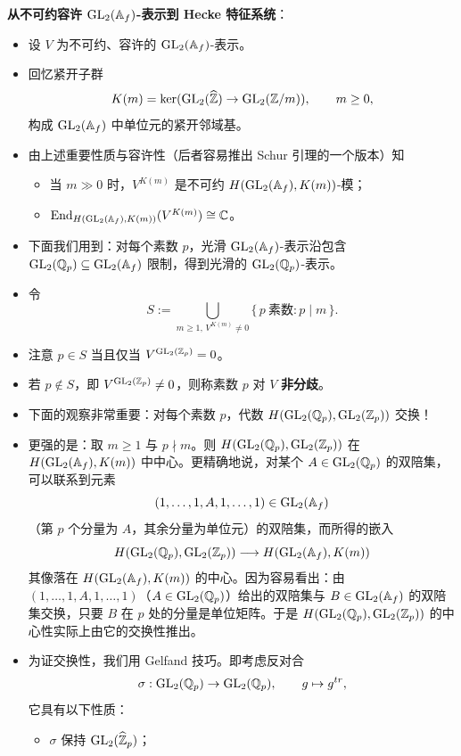 \textbf{从不可约容许 $\GL_2(\Af)$-表示到 Hecke 特征系统}：
\begin{itemize}
\item 设 $V$ 为不可约、容许的 $\GL_2(\Af)$-表示。
\item 回忆紧开子群
\[
K(m)=\ker(\GL_2(\widehat\Z)\to\GL_2(\Z/m)),\qquad m\ge0,
\]
构成 $\GL_2(\Af)$ 中单位元的紧开邻域基。
\item 由上述重要性质与容许性（后者容易推出 Schur 引理的一个版本）知
\begin{itemize}
\item 当 $m\gg0$ 时，$V^{K(m)}$ 是不可约 $H(\GL_2(\Af),K(m))$-模；
\item $\End_{H(\GL_2(\Af),K(m))}(V^{K(m)})\cong\C$。
\end{itemize}
\item 下面我们用到：对每个素数 $p$，光滑 $\GL_2(\Af)$-表示沿包含 $\GL_2(\Q_p)\subseteq\GL_2(\Af)$ 限制，得到光滑的 $\GL_2(\Q_p)$-表示。
\item 令
\[
S:=\bigcup_{m\ge1,\,V^{K(m)}\neq0}\{\,p\ \text{素数}:p\mid m\,\}.
\]
\item 注意 $p\in S$ 当且仅当 $V^{\GL_2(\Z_p)}=0$。
\item 若 $p\notin S$，即 $V^{\GL_2(\Z_p)}\neq0$，则称素数 $p$ 对 $V$ \textbf{非分歧}。
\item 下面的观察非常重要：对每个素数 $p$，代数 $H(\GL_2(\Q_p),\GL_2(\Z_p))$ 交换！
\item 更强的是：取 $m\ge1$ 与 $p\nmid m$。则 $H(\GL_2(\Q_p),\GL_2(\Z_p))$ 在 $H(\GL_2(\Af),K(m))$ 中中心。更精确地说，对某个 $A\in\GL_2(\Q_p)$ 的双陪集，可以联系到元素
\[
(1,\dots,1,A,1,\dots,1)\in\GL_2(\Af)
\]
（第 $p$ 个分量为 $A$，其余分量为单位元）的双陪集，而所得的嵌入
\[
H(\GL_2(\Q_p),\GL_2(\Z_p))\longrightarrow H(\GL_2(\Af),K(m))
\]
其像落在 $H(\GL_2(\Af),K(m))$ 的中心。因为容易看出：由 $(1,\dots,1,A,1,\dots,1)$（$A\in\GL_2(\Q_p)$）给出的双陪集与 $B\in\GL_2(\Af)$ 的双陪集交换，只要 $B$ 在 $p$ 处的分量是单位矩阵。于是 $H(\GL_2(\Q_p),\GL_2(\Z_p))$ 的中心性实际上由它的交换性推出。
\item 为证交换性，我们用 Gelfand 技巧。即考虑反对合
\[
\sigma:\GL_2(\Q_p)\to\GL_2(\Q_p),\qquad g\mapsto g^{tr},
\]
它具有以下性质：
\begin{itemize}
\item $\sigma$ 保持 $\GL_2(\widehat\Z_p)$；

\end{itemize}
\end{itemize}

